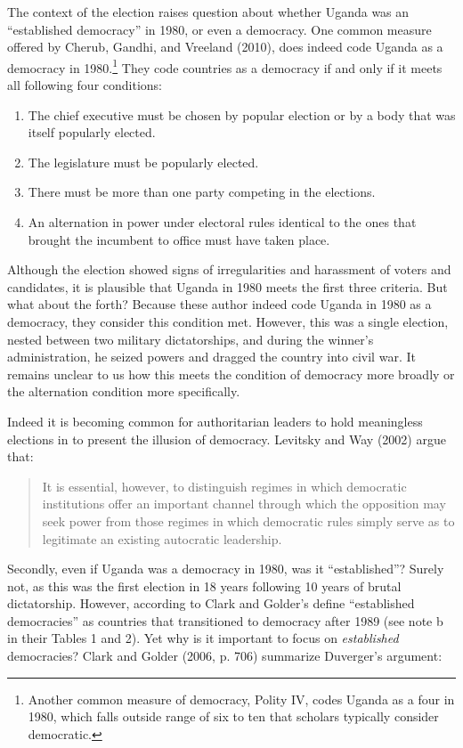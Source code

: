 \documentclass[12pt]{article}
\begin{document}
The context of the election raises question about whether Uganda was an ``established democracy'' in 1980, or even a democracy. 
One common measure offered by Cherub, Gandhi, and Vreeland (2010), does indeed code Uganda as a democracy in 1980.\footnote{Another common measure of democracy, Polity IV, codes Uganda as a four in 1980, which falls outside range of six to ten that scholars typically consider democratic.} 
They code countries as a democracy if and only if it meets all following four conditions:
\begin{enumerate}
\item The chief executive must be chosen by popular election or by a body that was itself popularly elected.
\item The legislature must be popularly elected.
\item There must be more than one party competing in the elections.
\item An alternation in power under electoral rules identical to the ones that brought the incumbent to office must have taken place.
\end{enumerate}

Although the election showed signs of irregularities and harassment of voters and candidates, it is plausible that Uganda in 1980 meets the first three criteria. 
But what about the forth? 
Because these author indeed code Uganda in 1980 as a democracy, they consider this condition met. 
However, this was a single election, nested between two military dictatorships, and during the winner's administration, he seized powers and dragged the country into civil war. 
It remains unclear to us how this meets the condition of democracy more broadly or the alternation condition more specifically.

Indeed it is becoming common for authoritarian leaders to hold meaningless elections in to present the illusion of democracy. Levitsky and Way (2002) argue that:
\begin{quote}
It is essential, however, to distinguish regimes in which democratic institutions offer an important channel through which the opposition may seek power from those regimes in which democratic rules simply serve as to legitimate an existing autocratic leadership.
\end{quote}



Secondly, even if Uganda was a democracy in 1980, was it ``established''? 
Surely not, as this was the first election in 18 years following 10 years of brutal dictatorship. 
However, according to Clark and Golder's define ``established democracies'' as countries that transitioned to democracy after 1989 (see note b in their Tables 1 and 2). 
Yet why is it important to focus on \textit{established} democracies? Clark and Golder (2006, p. 706) summarize Duverger's argument: 
\end{document}
